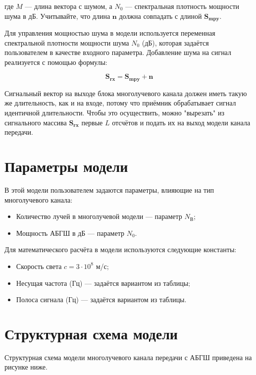 где $M$ — длина вектора с шумом, а $N_0$ — спектральная плотность мощности шума в дБ. Учитывайте, что длина $\mathbf{n}$ должна совпадать с длиной $\mathbf{S_{\text{mpy}}}$.

Для управления мощностью шума в модели используется переменная спектральной плотности мощности шума $N_0$ (дБ), которая задаётся пользователем в качестве входного параметра. Добавление шума на сигнал реализуется с помощью формулы:

\begin{equation}
\mathbf{S_{\text{rx}}} = \mathbf{S_{\text{mpy}}} + \mathbf{n}
\end{equation}

Сигнальный вектор на выходе блока многолучевого канала должен иметь такую же длительность, как и на входе, потому что приёмник обрабатывает сигнал идентичной длительности. Чтобы это осуществить, можно "вырезать" из сигнального массива $\mathbf{S_{\text{rx}}}$ первые $L$ отсчётов и подать их на выход модели канала передачи.

\section{Параметры модели}

В этой модели пользователем задаются параметры, влияющие на тип многолучевого канала:

\begin{itemize}
    \item Количество лучей в многолучевой модели — параметр $N_{\text{В}}$;
    \item Мощность АБГШ в дБ — параметр $N_0$.
\end{itemize}

Для математического расчёта в модели используются следующие константы:

\begin{itemize}
    \item Скорость света $c = 3 \cdot 10^8$ м/с;
    \item Несущая частота (Гц) — задаётся вариантом из таблицы;
    \item Полоса сигнала (Гц) — задаётся вариантом из таблицы.
\end{itemize}

\section{Структурная схема модели}

Структурная схема модели многолучевого канала передачи с АБГШ приведена на рисунке ниже.

